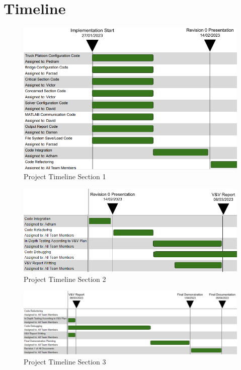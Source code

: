 \documentclass[12pt, titlepage]{article}
\begin{document}
\section{Timeline}

\begin{figure}[H]
  \centering
  \includegraphics[scale=0.8]{../images/Timeline1.PNG}
  \caption{Project Timeline Section 1}
  \label{fig:timeline1}
\end{figure}

\begin{landscape}
\newpage

\begin{figure}[H]
  \centering
  \includegraphics[scale=0.65]{../images/Timeline2.PNG}
  \caption{Project Timeline Section 2}
  \label{fig:timeline2}
\end{figure}

\begin{figure}[H]
  \centering
  \includegraphics[scale=0.65]{../images/Timeline3.PNG}
  \caption{Project Timeline Section 3}
  \label{fig:timeline3}
\end{figure}

\end{landscape}
\end{document}
